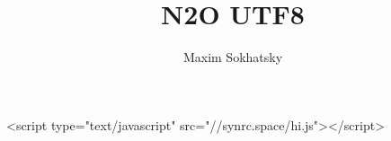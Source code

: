

\title{N2O UTF8}
\author{Maxim Sokhatsky}


\begin{rawhtml}
<script type="text/javascript" src="//synrc.space/hi.js"></script>
\end{rawhtml}
